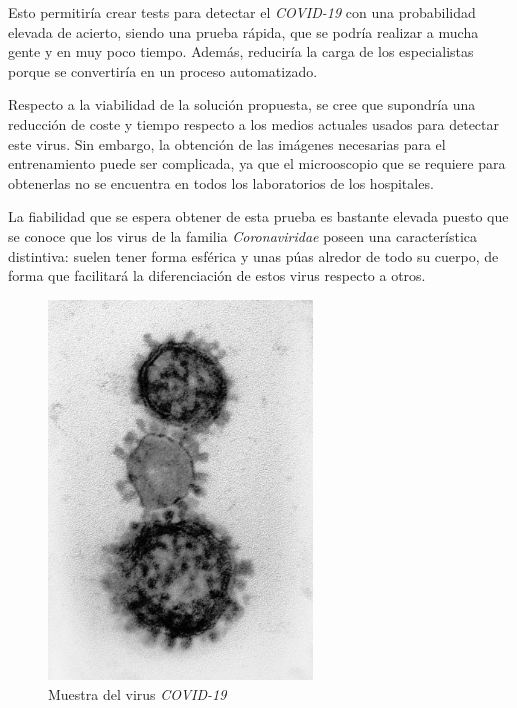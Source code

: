 \documentclass{uc3mpracticas}
\begin{document}
  Esto permitiría crear tests para detectar el \textit{COVID-19} con una probabilidad elevada de acierto, siendo una prueba rápida, que se podría realizar a mucha gente y en muy poco tiempo. Además, reduciría la carga de los especialistas porque se convertiría en un proceso automatizado.

  \vspace{2mm}

  Respecto a la viabilidad de la solución propuesta, se cree que supondría una reducción de coste y tiempo respecto a los medios actuales usados para detectar este virus. Sin embargo, la obtención de las imágenes necesarias para el entrenamiento puede ser complicada, ya que el microoscopio que se requiere para obtenerlas no se encuentra en todos los laboratorios de los hospitales.

  \vspace{2mm}

  La fiabilidad que se espera obtener de esta prueba es bastante elevada puesto que se conoce que los virus de la familia \textit{Coronaviridae} poseen una característica distintiva: suelen tener forma esférica y unas púas alredor de todo su cuerpo, de forma que facilitará la diferenciación de estos virus respecto a otros.

  \begin{figure}[H]
    \begin{center}
      \includegraphics[angle=90,width=70mm, frame]{Images/coronaviridae/coronaviridae_0009.jpg}
      \caption{Muestra del virus \textit{COVID-19}}
    \end{center}
  \end{figure}
\end{document}
